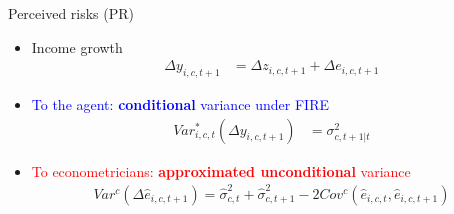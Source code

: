 \documentclass{beamer}
\begin{document}
\begin{frame}{Perceived risks (PR)}
	\begin{itemize}
		\item Income growth 
		\begin{equation*}
			\begin{split}
				\Delta y_{i,c,t+1} & =\Delta z_{i,c,t+1} +\Delta e_{i,c,t+1} 
			\end{split}
		\end{equation*}
		\item \textcolor{blue}{To the agent: \textbf{conditional} variance under FIRE}
		\begin{equation*}
			\begin{split}
				Var^*_{i,c,t}(\Delta y_{i,c,t+1}) & =\sigma^2_{c,t+1|t}
			\end{split}
		\end{equation*}
		\item \textcolor{red}{To econometricians: \textbf{approximated unconditional} variance} 
		\begin{equation*}
			\begin{split}
			Var^c(\Delta \hat e_{i,c,t+1})     = \hat\sigma^2_{c,t}+ \hat\sigma^2_{c,t+1} - 2Cov^c(\hat e_{i,c,t},\hat e_{i,c,t+1})
			\end{split}
		\end{equation*}
	
	\end{itemize}	
\end{frame}
\end{document}
